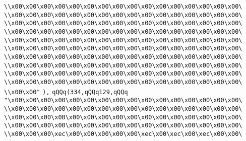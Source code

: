 \verb|\\x00\x00\x00\x00\x00\x00\x00\x00\x00\x00\x00\x00\x00\x00\x00\x00\|\newline
\verb|\\x00\x00\x00\x00\x00\x00\x00\x00\x00\x00\x00\x00\x00\x00\x00\x00\|\newline
\verb|\\x00\x00\x00\x00\x00\x00\x00\x00\x00\x00\x00\x00\x00\x00\x00\x00\|\newline
\verb|\\x00\x00\x00\x00\x00\x00\x00\x00\x00\x00\x00\x00\x00\x00\x00\x00\|\newline
\verb|\\x00\x00\x00\x00\x00\x00\x00\x00\x00\x00\x00\x00\x00\x00\x00\x00\|\newline
\verb|\\x00\x00\x00\x00\x00\x00\x00\x00\x00\x00\x00\x00\x00\x00\x00\x00\|\newline
\verb|\\x00\x00\x00\x00\x00\x00\x00\x00\x00\x00\x00\x00\x00\x00\x00\x00\|\newline
\verb|\\x00\x00\x00\x00\x00\x00\x00\x00\x00\x00\x00\x00\x00\x00\x00\x00\|\newline
\verb|\\x00\x00\x00\x00\x00\x00\x00\x00\x00\x00\x00\x00\x00\x00\x00\x00\|\newline
\verb|\\x00\x00\x00\x00\x00\x00\x00\x00\x00\x00\x00\x00\x00\x00\x00\x00\|\newline
\verb|\\x00\x00"|\newline
\verb|),|\newline
\verb|qQQq(334,qQQq129,qQQq|\newline
\verb|"\x00\x00\x00\x00\x00\x00\x00\x00\x00\x00\x00\x00\x00\x00\x00\x00\|\newline
\verb|\\x00\x00\x00\x00\x00\x00\x00\x00\x00\x00\x00\x00\x00\x00\x00\x00\|\newline
\verb|\\x00\x00\x00\x00\x00\x00\x00\x00\x00\x00\x00\x00\x00\x00\x00\x00\|\newline
\verb|\\x00\x00\x00\x00\x00\x00\x00\x00\x00\x00\x00\x00\x00\x00\x00\x00\|\newline
\verb|\\x00\x00\x00\xec\x00\x00\x00\x00\x00\xec\x00\xec\x00\xec\x00\x00\|\newline
